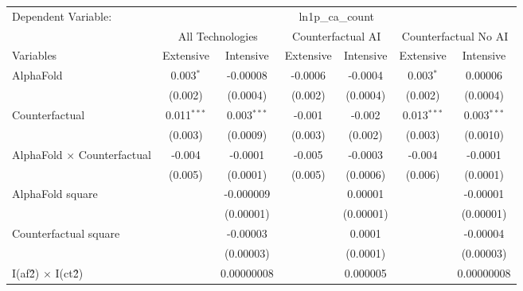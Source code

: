 \begingroup
\centering
\begin{tabular}{lcccccc}
   \tabularnewline \midrule \midrule
   Dependent Variable: & \multicolumn{6}{c}{ln1p\_ca\_count}\\
 & \multicolumn{2}{c}{All Technologies} & \multicolumn{2}{c}{Counterfactual AI} & \multicolumn{2}{c}{Counterfactual No AI} \\
\cmidrule(lr){1-1}\cmidrule(lr){2-3} \cmidrule(lr){4-5} \cmidrule(lr){6-7}
Variables & \multicolumn{1}{c}{Extensive} & \multicolumn{1}{c}{Intensive} & \multicolumn{1}{c}{Extensive} & \multicolumn{1}{c}{Intensive} & \multicolumn{1}{c}{Extensive} & \multicolumn{1}{c}{Intensive} \\
\cmidrule(lr){1-1}\cmidrule(lr){2-2} \cmidrule(lr){3-3} \cmidrule(lr){4-4} \cmidrule(lr){5-5} \cmidrule(lr){6-6} \cmidrule(lr){7-7}
   AlphaFold                          & 0.003$^{*}$   & -0.00008      & -0.0006 & -0.0004    & 0.003$^{*}$   & 0.00006\\   
                                      & (0.002)       & (0.0004)      & (0.002) & (0.0004)   & (0.002)       & (0.0004)\\   
   Counterfactual                     & 0.011$^{***}$ & 0.003$^{***}$ & -0.001  & -0.002     & 0.013$^{***}$ & 0.003$^{***}$\\   
                                      & (0.003)       & (0.0009)      & (0.003) & (0.002)    & (0.003)       & (0.0010)\\   
   AlphaFold $\times$ Counterfactual  & -0.004        & -0.0001       & -0.005  & -0.0003    & -0.004        & -0.0001\\   
                                      & (0.005)       & (0.0001)      & (0.005) & (0.0006)   & (0.006)       & (0.0001)\\   
   AlphaFold square                   &               & -0.000009     &         & 0.00001    &               & -0.00001\\   
                                      &               & (0.00001)     &         & (0.00001)  &               & (0.00001)\\   
   Counterfactual square              &               & -0.00003      &         & 0.0001     &               & -0.00004\\   
                                      &               & (0.00003)     &         & (0.0001)   &               & (0.00003)\\   
   I(af\^2) $\times$ I(ct\^2)         &               & 0.00000008    &         & 0.000005   &               & 0.00000008\\   

\end{tabular}
